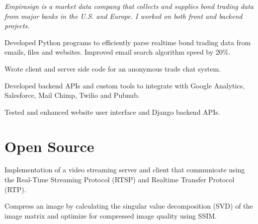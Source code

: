 \documentclass[letterpaper]{deedy-resume} %
\begin{document}
\begin{minipage}[t]{0.66\textwidth}
\sectionspace %


\textit{Empirasign is a market data company that collects and supplies bond trading data from major banks in the U.S. and Europe. I worked on both front and backend projects.}
\vspace{0.75mm}
\begin{tightitemize}
\item Developed Python programs to efficiently parse realtime bond trading data from emails, files and websites. Improved email search algorithm speed by 20\%.
\item Wrote client and server side code for an anonymous trade chat system.
\item Developed backend APIs and custom tools to integrate with Google Analytics, Salesforce, Mail Chimp, Twilio and Pubnub.
\item Tested and enhanced website user interface and Django backend APIs.
\end{tightitemize}

\sectionspace %


\section{Open Source}

Implementation of a video streaming server and client that communicate using the Real-Time Streaming Protocol (RTSP) and Realtime Transfer Protocol (RTP).

\sectionspace %

Compress an image by calculating the singular value decomposition (SVD) of the image matrix and optimize for compressed image quality using SSIM.





\end{minipage} %
\end{document}
